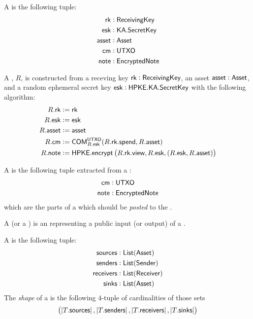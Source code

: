 \begin{definition}
    A \Receiver{} is the following tuple:
    \begin{align*}
        {\textsf{rk}}       &: {\textsf{ReceivingKey}} \\
        {\textsf{esk}}      &: {\textsf{KA}}.{\textsf{SecretKey}} \\
        {\textsf{asset}}    &: {\textsf{Asset}} \\
        {\textsf{cm}}       &: {\textsf{UTXO}} \\
        {\textsf{note}}     &: {\textsf{EncryptedNote}}
    \end{align*}
    
    A \Receiver{}, $R$, is constructed from a receving key ${\textsf{rk}} : {\textsf{ReceivingKey}}$, an asset ${\textsf{asset}} : {\textsf{Asset}}$, and a random ephemeral secret key ${\textsf{esk}} : {\textsf{HPKE}}.{\textsf{KA}}.{\textsf{SecretKey}}$ with the following algorithm:
    \begin{align*}
        R.{\textsf{rk}}       &:= {\textsf{rk}} \\
        R.{\textsf{esk}}      &:= {\textsf{esk}} \\
        R.{\textsf{asset}}    &:= {\textsf{asset}} \\
        R.{\textsf{cm}}       &:= {\textsf{COM}}^{{\textsf{UTXO}}}_{R.{\textsf{esk}}}(R.{\textsf{rk}}.{\textsf{spend}}, R.{\textsf{asset}}) \\
        R.{\textsf{note}}     &:= {\textsf{HPKE}}.{\textsf{encrypt}}\left(R.{\textsf{rk}}.{\textsf{view}}, R.{\textsf{esk}}, (R.{\textsf{esk}}, R.{\textsf{asset}})\right)
    \end{align*}
\end{definition}

\begin{definition}
    A \ReceiverPost{} is the following tuple extracted from a \Receiver{}:
    \begin{align*}
        {\textsf{cm}}       &: {\textsf{UTXO}} \\
        {\textsf{note}}     &: {\textsf{EncryptedNote}}
    \end{align*}
    which are the parts of a \Receiver{} which should be \emph{posted} to the \Ledger{}.
\end{definition}

\begin{definition}
    A \Source{} (or a \Sink{}) is an \Asset{} representing a public input (or output) of a \Transfer{}.
\end{definition}

\begin{definition}
    A \Transfer{} is the following tuple:
    \begin{align*}
        {\textsf{sources}}    &: {\textsf{List}}({\textsf{Asset}}) \\
        {\textsf{senders}}    &: {\textsf{List}}({\textsf{Sender}}) \\
        {\textsf{receivers}}  &: {\textsf{List}}({\textsf{Receiver}}) \\
        {\textsf{sinks}}      &: {\textsf{List}}({\textsf{Asset}})
    \end{align*}
    The \emph{shape} of a \Transfer{} is the following $4$-tuple of cardinalities of those sets
    \[\left(\left|T.{\textsf{sources}}\right|, \left|T.{\textsf{senders}}\right|, \left|T.{\textsf{receivers}}\right|, \left|T.{\textsf{sinks}}\right|\right)\]
\end{definition}

